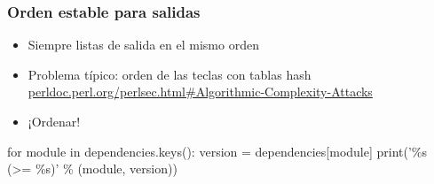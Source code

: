 \documentclass[14pt,aspectratio=169]{beamer}
\begin{document}
\begin{frame}[plain]
\end{frame}

\begin{frame}[fragile]
 \frametitle{Orden estable para salidas}

 \begin{itemize}
  \item Siempre listas de salida en el mismo orden
  \item Problema típico: orden de las teclas con tablas hash\\
    {\small \url{perldoc.perl.org/perlsec.html#Algorithmic-Complexity-Attacks}}
  \item<2> ¡Ordenar!
 \end{itemize}

 \begin{example}
\begin{semiverbatim}
for module in dependencies.keys():
    version = dependencies[module]
    print('\%s (>= \%s)' \% (module, version))
\end{semiverbatim}
 \end{example}
\end{frame}
\end{document}
